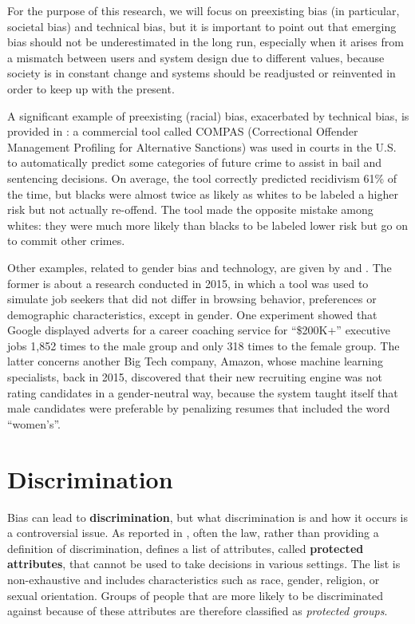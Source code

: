 For the purpose of this research, we will focus on preexisting bias (in particular, societal bias) and technical bias, but it is important to point out that emerging bias should not be underestimated in the long run, especially when it arises from a mismatch between users and system design due to different values, because society is in constant change and systems should be readjusted or reinvented in order to keep up with the present.

A significant example of preexisting (racial) bias, exacerbated by technical bias, is provided in \cite{angwin2016machine}: a commercial tool called COMPAS (Correctional Offender Management Profiling for Alternative Sanctions) was used in courts in the U.S. to automatically predict some categories of future crime to assist in bail and sentencing decisions. On average, the tool correctly predicted recidivism 61\% of the time, but blacks were almost twice as likely as whites to be labeled a higher risk but not actually re-offend. The tool made the opposite mistake among whites: they were much more likely than blacks to be labeled lower risk but go on to commit other crimes.

Other examples, related to gender bias and technology, are given by \cite{gibbs2015women} and \cite{dastin2018amazon}. The former is about a research conducted in 2015, in which a tool was used to simulate job seekers that did not differ in browsing behavior, preferences or demographic characteristics, except in gender. One experiment showed that Google displayed adverts for a career coaching service for ``\$200K+'' executive jobs 1,852 times to the male group and only 318 times to the female group. The latter concerns another Big Tech company, Amazon, whose machine learning specialists, back in 2015, discovered that their new recruiting engine was not rating candidates in a gender-neutral way, because the system taught itself that male candidates were preferable by penalizing resumes that included the word ``women's''.


\section{Discrimination}
Bias can lead to \textbf{discrimination}, but what discrimination is and how it occurs is a controversial issue. As reported in \cite{scantamburlo2018machine}, often the law, rather than providing a definition of discrimination, defines a list of attributes, called \textbf{protected attributes}, that cannot be used to take decisions in various settings. The list is non-exhaustive and includes characteristics such as race, gender, religion, or sexual orientation. Groups of people that are more likely to be discriminated against because of these attributes are therefore classified as \textit{protected groups}.

